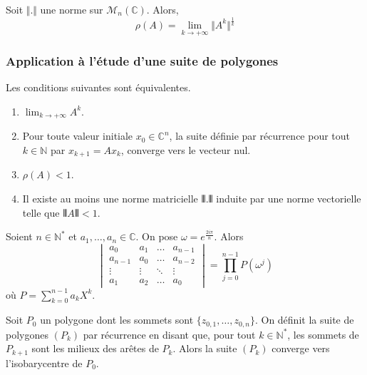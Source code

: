   \begin{corollary}
    Soit $\Vert . \Vert$ une norme sur $\mathcal{M}_n(\mathbb{C})$. Alors,
    \[ \rho(A) = \lim_{k \rightarrow +\infty} \Vert A^k \Vert^{\frac{1}{k}} \]
  \end{corollary}
  
  \subsubsection{Application à l'étude d'une suite de polygones}
  
  \begin{proposition}
    Les conditions suivantes sont équivalentes.
    \begin{enumerate}[label=(\roman*)]
      \item $\lim_{k \rightarrow +\infty} A^k$.
      \item Pour toute valeur initiale $x_0 \in \mathbb{C}^n$, la suite définie par récurrence pour tout $k \in \mathbb{N}$ par $x_{k+1} = A x_k$, converge vers le vecteur nul.
      \item $\rho(A) < 1$.
      \item Il existe au moins une norme matricielle $\VERT . \VERT$ induite par une norme vectorielle telle que $\VERT A \VERT < 1$.
    \end{enumerate}
  \end{proposition}
  
  
  \begin{lemma}
    \label{suite-de-polygones-1}
    Soient $n \in \mathbb{N}^*$ et $a_1, \dots, a_n \in \mathbb{C}$. On pose $\omega = e^{\frac{2i\pi}{n}}$. Alors
    \[ \begin{vmatrix} a_0 & a_1 & \dots & a_{n-1} \\ a_{n-1} & a_0 & \dots & a_{n-2}\\ \vdots & \vdots & \ddots & \vdots \\ a_1 & a_2 & \dots & a_0 \end{vmatrix} = \prod_{j=0}^{n-1} P(\omega^j) \]
    où $P = \sum_{k=0}^{n-1} a_k X^k$.
  \end{lemma}
  
  
  \begin{application}
    Soit $P_0$ un polygone dont les sommets sont $\{ z_{0,1}, \dots, z_{0,n} \}$. On définit la suite de polygones $(P_k)$ par récurrence en disant que, pour tout $k \in \mathbb{N}^*$, les sommets de $P_{k+1}$ sont les milieux des arêtes de $P_k$.
    \newpar
    Alors la suite $(P_k)$ converge vers l'isobarycentre de $P_0$.
  \end{application}
  
